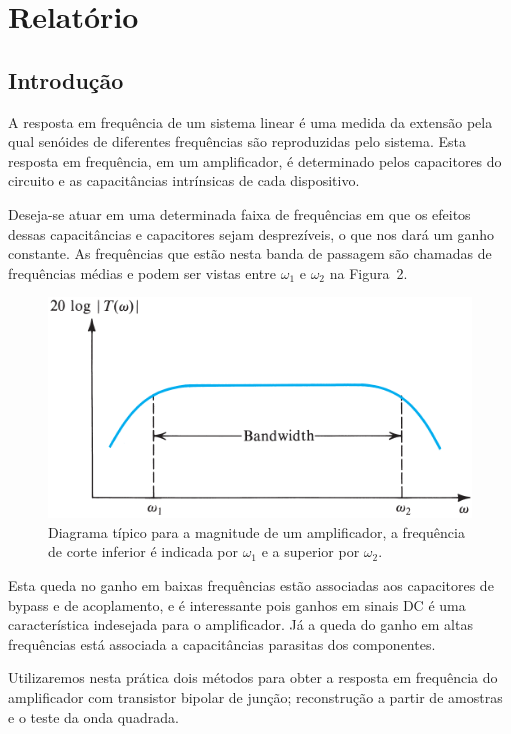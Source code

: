 \documentclass[12pt,a4paper]{article}
\begin{document}
\setcounter{figure}{1}
\setcounter{section}{2}
\setcounter{page}{6}
\section{Relatório}
\subsection{Introdução}
A resposta em frequência de um sistema linear é uma medida da extensão pela qual senóides de diferentes 
frequências são reproduzidas pelo sistema. Esta resposta em frequência, em um amplificador, é determinado 
pelos capacitores do circuito e as capacitâncias intrínsicas de cada dispositivo.

Deseja-se atuar em uma determinada faixa de frequências em que os efeitos dessas capacitâncias e capacitores sejam desprezíveis, 
o que nos dará um ganho constante. As frequências que estão nesta banda de passagem são chamadas de frequências médias e podem ser vistas entre $\omega_1$ e $\omega_2$ na Figura~2.
\begin{figure}[htpb]
  \centering
  \includegraphics[width=0.8\linewidth]{./img/bandpass.pdf}
  \caption{Diagrama típico para a magnitude de um amplificador, a frequência de corte inferior é indicada por $\omega_1$ e a superior por $\omega_2$.}
  \label{fig:2}
\end{figure}

Esta queda no ganho em baixas frequências estão associadas aos capacitores de bypass e de 
acoplamento, e é interessante pois ganhos em sinais DC é uma característica indesejada para o amplificador.
Já a queda do ganho em altas frequências está associada a capacitâncias parasitas dos componentes.

Utilizaremos nesta prática dois métodos para obter a resposta em frequência do amplificador com transistor bipolar de junção;
reconstrução a partir de amostras e o teste da onda quadrada.

\newpage
\end{document}
